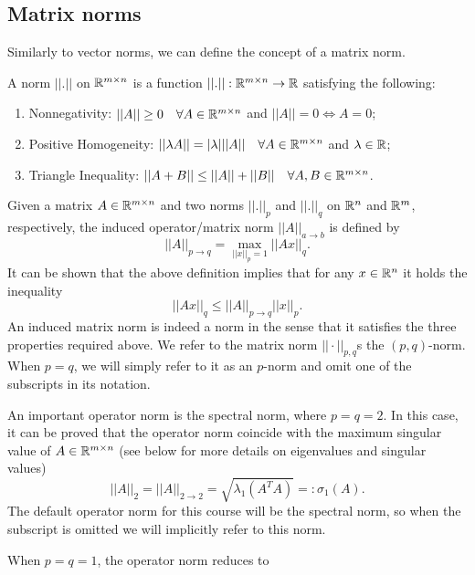 \documentclass[10pt,a4paper]{article}
\begin{document}
\subsection{Matrix norms}
Similarly to vector norms, we can define the concept of a matrix norm.
\begin{definition}
	A norm $||.||$ on $\mathbb{R}^{m\times n}$ is a function $||.||:\mathbb{R}^{m\times n} \to \mathbb{R}$ satisfying the following:
	\begin{enumerate}
		\item Nonnegativity: $||A|| \geq 0 \quad \forall A \in \mathbb{R}^{m\times n}$ and $||A|| = 0 \Leftrightarrow A =0$;
		\item Positive Homogeneity:  $||\lambda A|| = |\lambda| ||A|| \quad \forall A \in \mathbb{R}^{m\times n}$ and $\lambda\in \mathbb{R}$;
		\item Triangle Inequality: $||A+B|| \leq ||A|| + ||B|| \quad \forall A,B \in \mathbb{R}^{m\times n}$.
	\end{enumerate}
\end{definition}
Given a matrix $A\in \mathbb{R}^{m\times n}$ and two norms $||.||_p$ and $||.||_q$ on $\mathbb{R}^n$ and $\mathbb{R}^m$, respectively, the induced operator/matrix norm $||A||_{a\to b}$ is defined by
\begin{equation*}
	||A||_{p\to q} = \max_{||x||_p=1} ||Ax||_q. 
\end{equation*}
It can be shown that the above definition implies that for any $x \in \mathbb{R}^n$ it holds the inequality
\begin{equation*}
	||Ax||_q \leq ||A||_{p\to q} ||x||_p.
\end{equation*}
An induced matrix norm is indeed a norm in the sense that it satisfies the three properties required above. We refer to the matrix norm $||\cdot||_{p,q}$s the $(p, q)$-norm. When $p=q$, we will simply refer to it as an $p$-norm and omit one of the subscripts in its notation.
\par An important operator norm is the spectral norm, where $p=q=2$. In this case, it can be proved that the operator norm coincide with the maximum singular value of $A \in \mathbb{R}^{m\times n}$ (see below for more details on eigenvalues and singular values)
\begin{equation*}
	||A||_2 = ||A||_{2\to2} = \sqrt{\lambda_1 (A^TA)} =: \sigma_1 (A).
\end{equation*}
The default operator norm for this course will be the spectral norm, so when the subscript is omitted we will implicitly refer to this norm.
\par When $p=q=1$, the operator norm reduces to 
\end{document}
